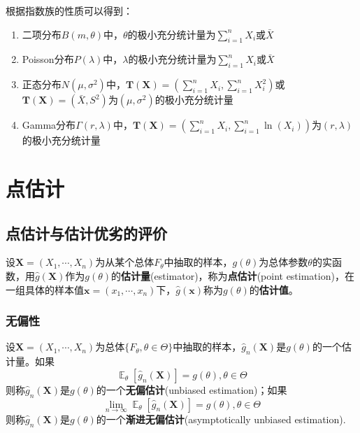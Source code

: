 \documentclass{ctexbook}
\DeclareMathOperator{\E}{\mathbb{E}}     %
\begin{document}
\begin{proposition}
    根据指数族的性质可以得到：
    \begin{enumerate}
        \item 二项分布$B(m,\theta)$中，$\theta$的极小充分统计量为$\sum_{i=1}^n X_i$或$\bar{X}$
        \item Poisson分布$P(\lambda)$中，$\lambda$的极小充分统计量为$\sum_{i=1}^n X_i$或$\bar{X}$
        \item 正态分布$N(\mu,\sigma^2)$中，$\mathbf{T}(\mathbf{X})=\left(\sum_{i=1}^n X_i,\sum_{i=1}^n X_i^2\right)$或$\mathbf{T}(\mathbf{X})=\left(\bar{X},S^2\right)$为$(\mu,\sigma^2)$的极小充分统计量
        \item Gamma分布$\Gamma(r,\lambda)$中，$\mathbf{T}(\mathbf{X})=\left(\sum_{i=1}^n X_i,\sum_{i=1}^n \ln(X_i)\right)$为$(r,\lambda)$的极小充分统计量
    \end{enumerate}
\end{proposition}

\chapter{点估计}

\section{点估计与估计优劣的评价}

\begin{definition}[点估计]
    设$\mathbf{X}=(X_1,\cdots,X_n)$为从某个总体$F_\theta$中抽取的样本，$g(\theta)$为总体参数$\theta$的实函数，用$\hat{g}(\mathbf{X})$作为$g(\theta)$的\textbf{估计量}(estimator)，称为\textbf{点估计}(point estimation)，在一组具体的样本值$\mathbf{x}=(x_1,\cdots,x_n)$下，$\hat{g}(\mathbf{x})$称为$g(\theta)$的\textbf{估计值}。
\end{definition}

\subsection{无偏性}

\begin{definition}[无偏估计]
    设$\mathbf{X}=(X_1,\cdots,X_n)$为总体$\{F_\theta,\theta\in\Theta\}$中抽取的样本，$\hat{g}_n(\mathbf{X})$是$g(\theta)$的一个估计量。如果
    $$\E_\theta[\hat{g}_n(\mathbf{X})]=g(\theta),\theta\in\Theta$$
    则称$\hat{g}_n(\mathbf{X})$是$g(\theta)$的一个\textbf{无偏估计}(unbiased estimation)；如果
    $$\lim_{n\to\infty}\E_\theta[\hat{g}_n(\mathbf{X})]=g(\theta),\theta\in\Theta$$
    则称$\hat{g}_n(\mathbf{X})$是$g(\theta)$的一个\textbf{渐进无偏估计}(asymptotically unbiased estimation).
\end{definition}
\end{document}
